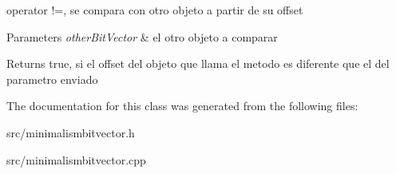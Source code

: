 operator !=, se compara con otro objeto a partir de su offset 


\begin{DoxyParams}{Parameters}
{\em other\-Bit\-Vector} & el otro objeto a comparar \\
\hline
\end{DoxyParams}
\begin{DoxyReturn}{Returns}
true, si el offset del objeto que llama el metodo es diferente que el del parametro enviado 
\end{DoxyReturn}


The documentation for this class was generated from the following files\-:\begin{DoxyCompactItemize}
\item 
src/minimalismbitvector.\-h\item 
src/minimalismbitvector.\-cpp\end{DoxyCompactItemize}
